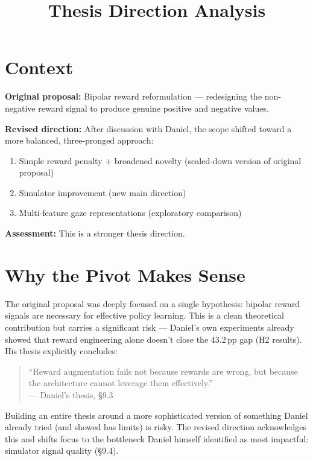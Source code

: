 \documentclass[11pt,a4paper]{article}
\title{Thesis Direction Analysis}
\author{}
\date{}
\begin{document}
\maketitle

\section{Context}

\textbf{Original proposal:} Bipolar reward reformulation --- redesigning the non-negative reward signal to produce genuine positive and negative values.

\textbf{Revised direction:} After discussion with Daniel, the scope shifted toward a more balanced, three-pronged approach:

\begin{enumerate}
    \item Simple reward penalty + broadened novelty (scaled-down version of original proposal)
    \item Simulator improvement (new main direction)
    \item Multi-feature gaze representations (exploratory comparison)
\end{enumerate}

\textbf{Assessment:} This is a stronger thesis direction.


\section{Why the Pivot Makes Sense}

The original proposal was deeply focused on a single hypothesis: bipolar reward signals are necessary for effective policy learning. This is a clean theoretical contribution but carries a significant risk --- Daniel's own experiments already showed that reward engineering alone doesn't close the 43.2\,pp gap (H2 results). His thesis explicitly concludes:

\begin{quote}
``Reward augmentation fails not because rewards are wrong, but because the architecture cannot leverage them effectively.''\\
--- Daniel's thesis, \S9.3
\end{quote}

Building an entire thesis around a more sophisticated version of something Daniel already tried (and showed has limits) is risky. The revised direction acknowledges this and shifts focus to the bottleneck Daniel himself identified as most impactful: simulator signal quality (\S9.4).
\end{document}
